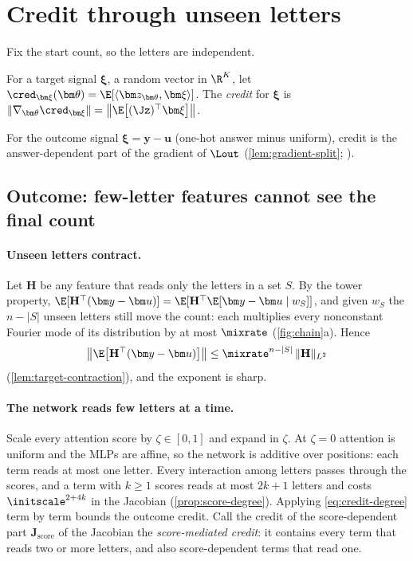 \section{Credit through unseen letters}
\label{sec:credit}

Fix the start count, so the letters are independent.

\begin{definition}[Credit]
\label{def:credit}
For a target signal $\bm\xi$, a random vector in $\R^K$, let $\cred_{\bm\xi}(\bm\theta)=\E[\langle\bm z_{\bm\theta},\bm\xi\rangle]$. The
\emph{credit} for $\bm\xi$ is $\|\nabla_{\bm\theta}\cred_{\bm\xi}\|=\bigl\|\E\bigl[(\Jz)^\top\bm\xi\bigr]\bigr\|$.
\end{definition}

For the outcome signal $\bm\xi=\bm y-\bm u$ (one-hot answer minus uniform), credit is the answer-dependent part of the gradient of
$\Lout$ (\cref{lem:gradient-split}; \citealp{shalevshwartz2017failures,abbe2025parities}).

\subsection{Outcome: few-letter features cannot see the final count}
\paragraph{Unseen letters contract.} Let $\mathbf H$ be any feature that reads only the letters in a set $S$. By the tower property,
$\E[\mathbf H^\top(\bm y-\bm u)]=\E[\mathbf H^\top\E[\bm y-\bm u\mid w_S]]$, and given $w_S$ the $n-|S|$ unseen letters still move the count: each
multiplies every nonconstant Fourier mode of its distribution by at most $\mixrate$ (\cref{fig:chain}a). Hence
\begin{equation}
 \bigl\|\E\bigl[\mathbf H^\top(\bm y-\bm u)\bigr]\bigr\|\le\mixrate^{n-|S|}\,\|\mathbf H\|_{L^2}
 \label{eq:credit-degree}
\end{equation}
(\cref{lem:target-contraction}), and the exponent is sharp.

\paragraph{The network reads few letters at a time.} Scale every attention score by $\zeta\in[0,1]$ and expand in $\zeta$. At $\zeta=0$ attention is uniform
and the MLPs are affine, so the network is additive over positions: each term reads at most one letter. Every interaction among letters
passes through the scores, and a term with $k\ge1$ scores reads at most $2k+1$ letters and costs $\initscale^{2+4k}$ in the Jacobian
(\cref{prop:score-degree}). Applying \cref{eq:credit-degree} term by term bounds the outcome credit. Call the credit of the score-dependent part
$\mathbf J_{\mathrm{score}}$ of the Jacobian the \emph{score-mediated credit}: it contains every term that reads two or more letters, and
also score-dependent terms that read one.


